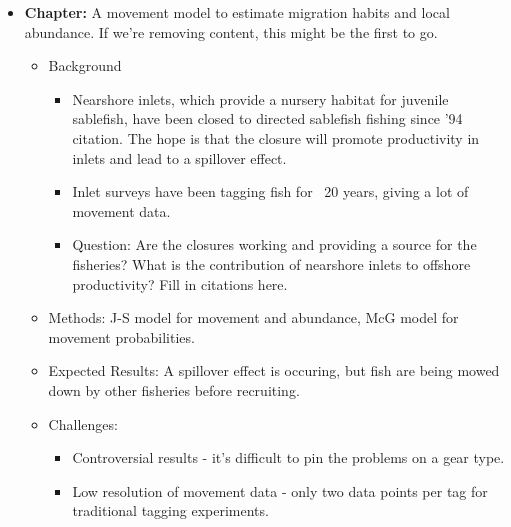 \documentclass{article}
\newcommand{\sj}[1]{{\color{red}\mbox{}\marginpar{\raggedleft\hspace{0pt}*} #1}}
\begin{document}
\begin{itemize}
\begin{itemize}
    \end{itemize}
  \item {\bf Chapter:} A movement model to estimate migration habits and local abundance. \sj{If we're removing content, this might be the first to go.}
    \begin{itemize}
      \item Background
        \begin{itemize}
          \item Nearshore inlets, which provide a nursery habitat for juvenile sablefish, have been closed to directed sablefish fishing since '94 \sj{citation}. The hope is that the closure will promote productivity in inlets and lead to a spillover effect.
          \item Inlet surveys have been tagging fish for ~20 years, giving a lot of movement data.
          \item Question: Are the closures working and providing a source for the fisheries? What is the contribution of nearshore inlets to offshore productivity? \citep{mcgarvey2002estimating,brownie1993capture} \sj{Fill in citations here.}
        \end{itemize}
      \item Methods: J-S model for movement and abundance, McG model for movement probabilities.
      \item Expected Results: A spillover effect is occuring, but fish are being mowed down by other fisheries before recruiting.
      \item Challenges: 
        \begin{itemize}
          \item Controversial results - it's difficult to pin the problems on a gear type.
          \item Low resolution of movement data - only two data points per tag for traditional tagging experiments.
        \end{itemize}
    \end{itemize}


\end{itemize}
\end{document}
